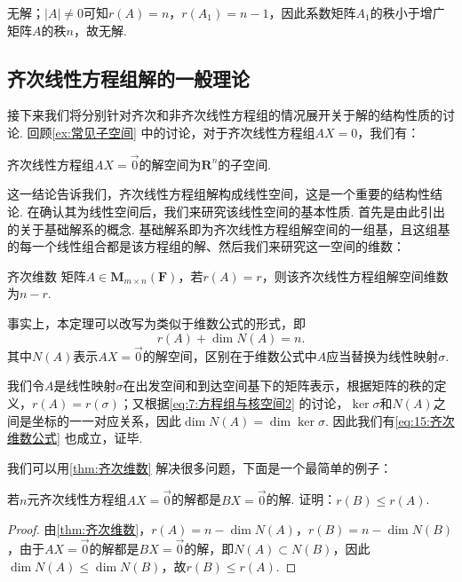 \begin{solution}
    无解；$|A|\neq 0$可知$r(A)=n$，$r(A_1)=n-1$，因此系数矩阵$A_1$的秩小于增广矩阵$A$的秩$n$，故无解.
\end{solution}

\subsection{齐次线性方程组解的一般理论}

接下来我们将分别针对齐次和非齐次线性方程组的情况展开关于解的结构性质的讨论. 回顾\autoref{ex:常见子空间} 中的讨论，对于齐次线性方程组$AX=0$，我们有：
\begin{theorem}{}{}
    齐次线性方程组$AX=\vec{0}$的解空间为$\mathbf{R}^n$的子空间.
\end{theorem}
这一结论告诉我们，齐次线性方程组解构成线性空间，这是一个重要的结构性结论. 在确认其为线性空间后，我们来研究该线性空间的基本性质. 首先是由此引出的关于基础解系的概念. 基础解系即为齐次线性方程组解空间的一组基，且这组基的每一个线性组合都是该方程组的解、然后我们来研究这一空间的维数：
\begin{theorem}{}{齐次维数}
    矩阵$A \in \mathbf{M}_{m \times n}(\mathbf{F})$，若$r(A) = r$，则该齐次线性方程组解空间维数为$n - r$.
\end{theorem}
事实上，本定理可以改写为类似于维数公式的形式，即
\begin{equation}\label{eq:15:齐次维数公式}
    r(A) + \dim N(A) = n.
\end{equation}
其中$N(A)$表示$AX=\vec{0}$的解空间，区别在于维数公式中$A$应当替换为线性映射$\sigma$.

我们令$A$是线性映射$\sigma$在出发空间和到达空间基下的矩阵表示，根据矩阵的秩的定义，$r(A)=r(\sigma)$；又根据\autoref{eq:7:方程组与核空间2} 的讨论，$\ker\sigma$和$N(A)$之间是坐标的一一对应关系，因此$\dim N(A)=\dim\ker\sigma$. 因此我们有\autoref{eq:15:齐次维数公式} 也成立，证毕.

我们可以用\autoref{thm:齐次维数} 解决很多问题，下面是一个最简单的例子：
\begin{example}{}{}
    若$n$元齐次线性方程组$AX = \vec{0}$的解都是$BX = \vec{0}$的解. 证明：$r(B) \leqslant r(A)$.
\end{example}

\begin{proof}
    由\autoref{thm:齐次维数}，$r(A)=n-\dim N(A)$，$r(B)=n-\dim N(B)$，由于$AX=\vec{0}$的解都是$BX=\vec{0}$的解，即$N(A) \subset N(B)$，因此$\dim N(A) \leqslant \dim N(B)$，故$r(B) \leqslant r(A)$.
\end{proof}

